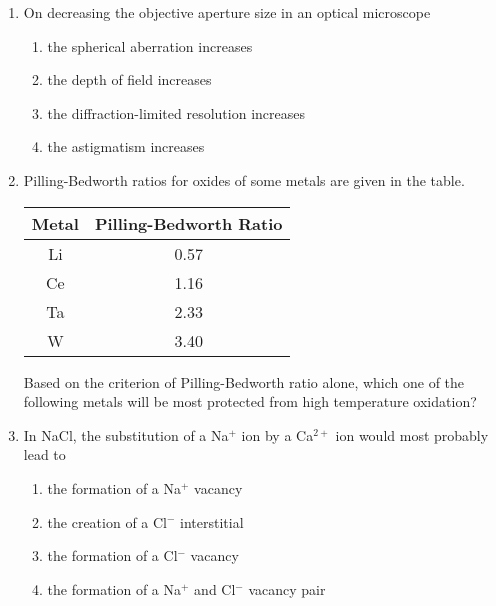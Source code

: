 \begin{enumerate}

\item On decreasing the objective aperture size in an optical microscope

\begin{enumerate}
    \item the spherical aberration increases
    \item the depth of field increases
    \item the diffraction-limited resolution increases
    \item the astigmatism increases
\end{enumerate}
\bigskip

\item Pilling-Bedworth ratios for oxides of some metals are given in the table.

\begin{table}[h]    
  \begin{tabular}{|c|c|}
    \hline
    Metal & Pilling-Bedworth Ratio \\
    \hline
    Li & 0.57 \\
    Ce & 1.16 \\
    Ta & 2.33 \\
    W & 3.40 \\
    \hline
    \end{tabular}
\end{table}

Based on the criterion of Pilling-Bedworth ratio alone, which one of the following metals will be most protected from high temperature oxidation?

\begin{enumerate}
\end{enumerate}
\bigskip

\item In NaCl, the substitution of a Na$^+$ ion by a Ca$^{2+}$ ion would most probably lead to

\begin{enumerate}
    \item the formation of a Na$^+$ vacancy
    \item the creation of a Cl$^-$ interstitial
    \item the formation of a Cl$^-$ vacancy
    \item the formation of a Na$^+$ and Cl$^-$ vacancy pair
\end{enumerate}
\bigskip


\end{enumerate}
